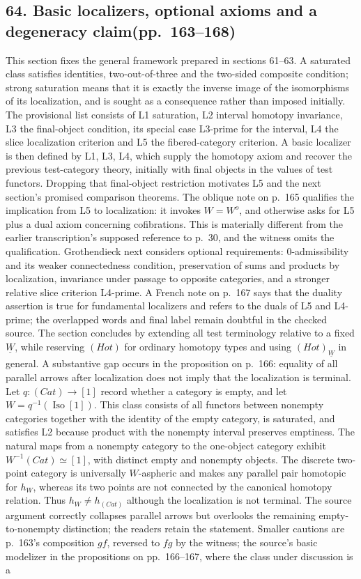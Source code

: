\documentclass[10pt,oneside]{book}
\begin{document}
\subsection*{64. Basic localizers, optional axioms and a degeneracy claim\newline (pp.~163--168)}
This section fixes the general framework prepared in sections 61--63. A saturated class satisfies identities, two-out-of-three and the two-sided composite condition; strong saturation means that it is exactly the inverse image of the isomorphisms of its localization, and is sought as a consequence rather than imposed initially. The provisional list consists of L1 saturation, L2 interval homotopy invariance, L3 the final-object condition, its special case L3-prime for the interval, L4 the slice localization criterion and L5 the fibered-category criterion. A basic localizer is then defined by L1, L3, L4, which supply the homotopy axiom and recover the previous test-category theory, initially with final objects in the values of test functors. Dropping that final-object restriction motivates L5 and the next section's promised comparison theorems. The oblique note on p.~165 qualifies the implication from L5 to localization: it invokes $W=W^o$, and otherwise asks for L5 plus a dual axiom concerning cofibrations. This is materially different from the earlier transcription's supposed reference to p.~30, and the witness omits the qualification. Grothendieck next considers optional requirements: 0-admissibility and its weaker connectedness condition, preservation of sums and products by localization, invariance under passage to opposite categories, and a stronger relative slice criterion L4-prime. A French note on p.~167 says that the duality assertion is true for fundamental localizers and refers to the duals of L5 and L4-prime; the overlapped words and final label remain doubtful in the checked source. The section concludes by extending all test terminology relative to a fixed $\underline W$, while reserving $(Hot)$ for ordinary homotopy types and using $(Hot)_{\underline W}$ in general. A substantive gap occurs in the proposition on p.~166: equality of all parallel arrows after localization does not imply that the localization is terminal. Let $q:(Cat)\to[1]$ record whether a category is empty, and let $W=q^{-1}(\operatorname{Iso}[1])$. This class consists of all functors between nonempty categories together with the identity of the empty category, is saturated, and satisfies L2 because product with the nonempty interval preserves emptiness. The natural maps from a nonempty category to the one-object category exhibit $W^{-1}(Cat)\simeq[1]$, with distinct empty and nonempty objects. The discrete two-point category is universally $W$-aspheric and makes any parallel pair homotopic for $h_W$, whereas its two points are not connected by the canonical homotopy relation. Thus $h_W\ne h_{(Cat)}$ although the localization is not terminal. The source argument correctly collapses parallel arrows but overlooks the remaining empty-to-nonempty distinction; the readers retain the statement. Smaller cautions are p.~163's composition $gf$, reversed to $fg$ by the witness; the source's basic modelizer in the propositions on pp.~166--167, where the class under discussion is a 
\end{document}
